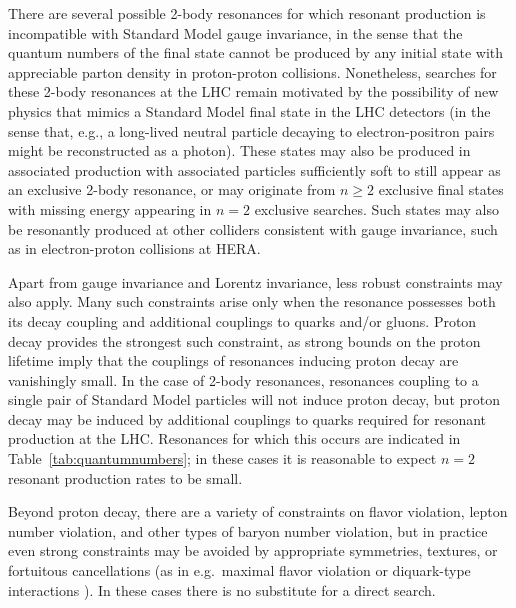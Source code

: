 There are several possible 2-body resonances for which resonant production is incompatible with Standard Model gauge invariance, in the sense that the quantum numbers of the final state cannot be produced by any initial state with appreciable parton density in proton-proton collisions. Nonetheless, searches for these 2-body resonances at the LHC remain motivated by the possibility of new physics that mimics a Standard Model final state in the LHC detectors (in the sense that, e.g., a long-lived neutral particle decaying to electron-positron pairs might be reconstructed as a photon). These states may also be produced in associated production with associated particles sufficiently soft to still appear as an exclusive 2-body resonance, or may originate from $n \geq 2$ exclusive final states with missing energy appearing in $n=2$ exclusive searches. Such states may also be resonantly produced at other colliders consistent with gauge invariance, such as in electron-proton collisions at HERA.

Apart from gauge invariance and Lorentz invariance, less robust constraints may also apply. Many such constraints arise only when the resonance possesses both its decay coupling and additional couplings to quarks and/or gluons. Proton decay provides the strongest such constraint, as strong bounds on the proton lifetime imply that the couplings of resonances inducing proton decay are vanishingly small. In the case of 2-body resonances, resonances coupling to a single pair of Standard Model particles will not induce proton decay, but proton decay may be induced by additional couplings to quarks required for resonant production at the LHC. Resonances for which this occurs are indicated in Table~\ref{tab:quantumnumbers}; in these cases it is reasonable to expect $n=2$ resonant production rates to be small.

Beyond proton decay, there are a variety of constraints on flavor violation, lepton number violation, and other types of baryon number violation, but in practice even strong constraints may be avoided by appropriate symmetries, textures, or fortuitous cancellations (as in e.g.~maximal flavor violation \cite{BarShalom:2007pw} or diquark-type interactions \cite{Giudice:2011ak}). In these cases there is no substitute for a direct search. 

